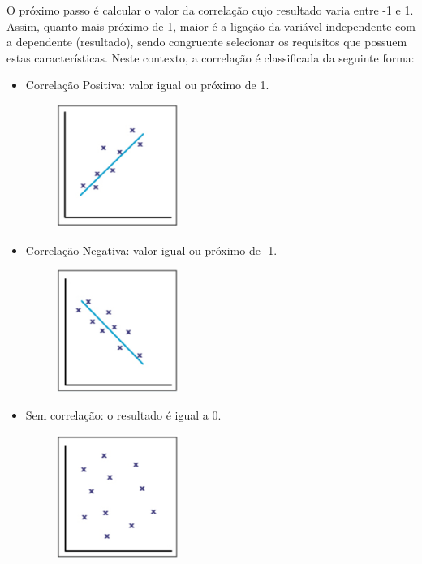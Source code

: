 \documentclass[conference]{IEEEtran}
\begin{document}
O próximo passo é calcular o valor da correlação cujo resultado varia entre -1 e 1. Assim, quanto mais próximo de 1, maior é a ligação da variável independente com a dependente (resultado), sendo congruente selecionar os requisitos que possuem estas características. Neste contexto, a correlação é classificada da seguinte forma:

\begin{itemize}
\item Correlação Positiva: valor igual ou próximo de 1.

\vspace{7mm}
\centerline{\includegraphics[width=60mm,height=40mm,keepaspectratio]{Diagrama1.png}}
\vspace{7mm}
\item Correlação Negativa: valor igual ou próximo de -1.

\vspace{7mm}
\centerline{\includegraphics[width=60mm,height=40mm,keepaspectratio]{Diagrama2.png}}
\vspace{7mm}
\item Sem correlação: o resultado é igual a 0.

\vspace{7mm}
\centerline{\includegraphics[width=60mm,height=40mm,keepaspectratio]{Diagrama3.png}}
\vspace{7mm}
\end{itemize}
\end{document}
